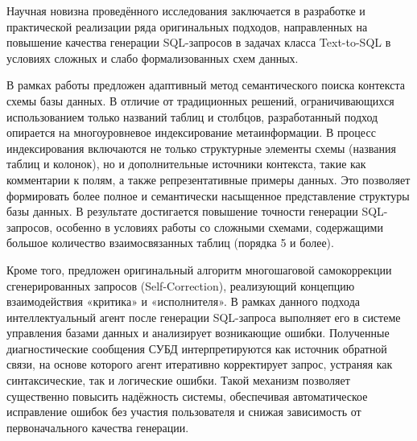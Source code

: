 
Научная новизна проведённого исследования заключается в разработке и практической реализации ряда оригинальных подходов, направленных на повышение качества генерации SQL-запросов в задачах класса Text-to-SQL в условиях сложных и слабо формализованных схем данных.

В рамках работы предложен адаптивный метод семантического поиска контекста схемы базы данных. В отличие от традиционных решений, ограничивающихся использованием только названий таблиц и столбцов, разработанный подход опирается на многоуровневое индексирование метаинформации. В процесс индексирования включаются не только структурные элементы схемы (названия таблиц и колонок), но и дополнительные источники контекста, такие как комментарии к полям, а также репрезентативные примеры данных. Это позволяет формировать более полное и семантически насыщенное представление структуры базы данных. В результате достигается повышение точности генерации SQL-запросов, особенно в условиях работы со сложными схемами, содержащими большое количество взаимосвязанных таблиц (порядка 5 и более).

Кроме того, предложен оригинальный алгоритм многошаговой самокоррекции сгенерированных запросов (Self-Correction), реализующий концепцию взаимодействия «критика» и «исполнителя». В рамках данного подхода интеллектуальный агент после генерации SQL-запроса выполняет его в системе управления базами данных и анализирует возникающие ошибки. Полученные диагностические сообщения СУБД интерпретируются как источник обратной связи, на основе которого агент итеративно корректирует запрос, устраняя как синтаксические, так и логические ошибки. Такой механизм позволяет существенно повысить надёжность системы, обеспечивая автоматическое исправление ошибок без участия пользователя и снижая зависимость от первоначального качества генерации.
